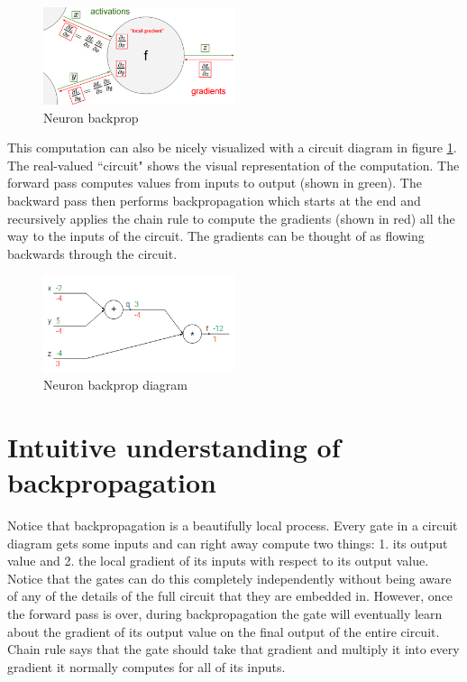 \begin{figure}[h]
  \centering
  \includegraphics[width=0.5\textwidth]{Images/backprop/1.png}
  \caption{Neuron backprop}
\end{figure}

This computation can also be nicely visualized with a circuit diagram in figure \ref{fig:backdiag1}. The real-valued ``circuit" shows the visual representation of the computation. The forward pass computes values from inputs to output (shown in green). The backward pass then performs backpropagation which starts at the end and recursively applies the chain rule to compute the gradients (shown in red) all the way to the inputs of the circuit. The gradients can be thought of as flowing backwards through the circuit.

\begin{figure}[h]
  \centering
  \includegraphics[width=0.5\textwidth]{Images/backprop/2.png}
  \caption{Neuron backprop diagram}
   \label{fig:backdiag1}
\end{figure}

\section*{Intuitive understanding of backpropagation}

Notice that backpropagation is a beautifully local process. Every gate in a circuit diagram gets some inputs and can right away compute two things: 1. its output value and 2. the local gradient of its inputs with respect to its output value. Notice that the gates can do this completely independently without being aware of any of the details of the full circuit that they are embedded in. However, once the forward pass is over, during backpropagation the gate will eventually learn about the gradient of its output value on the final output of the entire circuit. Chain rule says that the gate should take that gradient and multiply it into every gradient it normally computes for all of its inputs.

